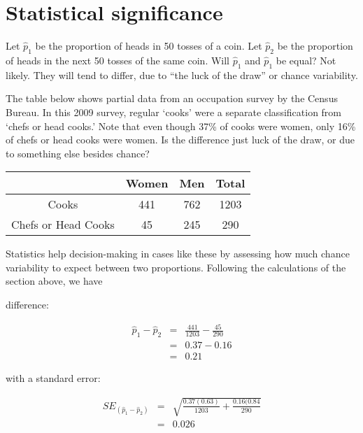 \documentclass[11pt]{book}\usepackage[]{graphicx}\usepackage[]{color}
\begin{document}
\section{Statistical significance}

Let $\hat{p}_1$ be the proportion of heads in 50 tosses of a coin.  Let $\hat{p}_2$  be the proportion of heads in the next 50 tosses of the same coin.  Will $\hat{p}_1$  and $\hat{p}_1$ be equal?  Not likely.  They will tend to differ, due to ``the luck of the draw'' or chance variability.

The table below shows partial data from an occupation survey by the Census Bureau. In this 2009 survey, regular `cooks' were a separate classification from `chefs or head cooks.'  Note that even though 37\% of cooks were women, only 16\% of chefs or head cooks were women.  Is the difference just luck of the draw, or due to something else besides chance?

\begin{table}[ht]
\centering
\begin{tabular}{@{} cccc @{}} \hline
       & Women & Men & Total \\ \hline
Cooks & 441 & 762 & 1203 \\
Chefs or Head Cooks & 45 & 245 & 290 \\ \hline
\end{tabular}
\end{table}

Statistics help decision-making in cases like these by assessing how much chance variability to expect between two proportions.  Following the calculations of the section above, we have

\vspace{4mm}

\begin{minipage}[ht]{7cm}

difference: 

\begin{eqnarray*}
  \hat{p}_1 - \hat{p}_2 &=& \frac{441}{1203} - \frac{45}{290} \\
    &=& 0.37 - 0.16 \\
    &=& 0.21
\end{eqnarray*}

\end{minipage}
\begin{minipage}[ht]{7cm}

with a standard error:

\begin{eqnarray*}
  SE_{(\hat{p}_1 - \hat{p}_2)} &=& \sqrt{ \frac{0.37(0.63)}{1203} + \frac{0.16(0.84}{290}} \\
  &=& 0.026
\end{eqnarray*}

\end{minipage}
\end{document}
